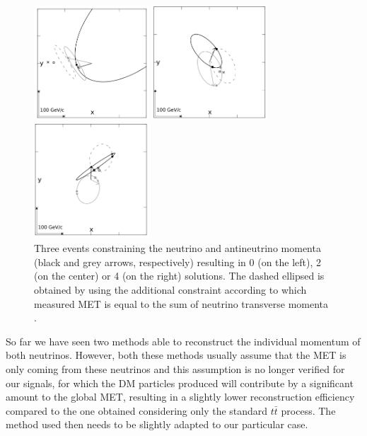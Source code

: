 \documentclass[a4paper, 10pt, openright]{report}
\begin{document}
\begin{itemize}
\begin{figure}[htbp]
\centering
\begin{minipage}[b]{.32\textwidth}
\includegraphics[width=4.3cm, height=4.3cm]{figs/ellipse0.png}
\end{minipage}\hfill
\begin{minipage}[b]{.32\textwidth}
\includegraphics[width=4.3cm, height=4.3cm]{figs/ellipse2.png}
\end{minipage} \hfill
\begin{minipage}[b]{.32\textwidth}
\includegraphics[width=4.3cm, height=4.3cm]{figs/ellipse4.png}
\end{minipage} \hfill
\caption{ Three events constraining the neutrino and antineutrino momenta (black and grey arrows, respectively) resulting in 0 (on the left), 2 (on the center) or 4 (on the right) solutions. The dashed ellipsed is obtained by using the additional constraint according to which measured \ac{MET} is equal to the sum of neutrino transverse momenta \cite{Betchart}.}
\label{fig:ellipses}
\end{figure}

\end{itemize}

So far we have seen two methods able to reconstruct the individual momentum of both neutrinos. However, both these methods usually assume that the \ac{MET} is only coming from these neutrinos and this assumption is no longer verified for our signals, for which the \ac{DM} particles produced will contribute by a significant amount to the global \ac{MET}, resulting in a slightly lower reconstruction efficiency compared to the one obtained considering only the standard $t \bar t$ process. The method used then needs to be slightly adapted to our particular case.
\end{document}
